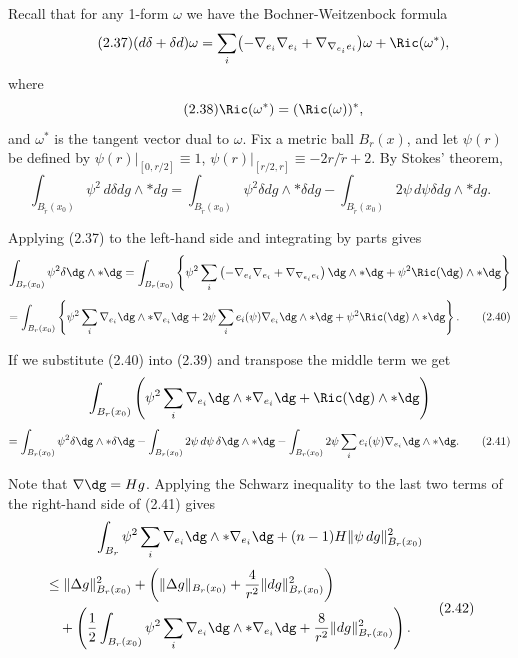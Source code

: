 Recall that for any 1-form $\omega$ we have the Bochner-Weitzenbock formula
\begin{equation}\tag{2.37}
(d\delta+\delta d)\omega=\sum_i\bigl(-\nabla_{e_i}\nabla_{e_i}+\nabla_{\nabla_{e_i}e_i}\bigr)\omega+\Ric(\omega^*),
\end{equation}
where
\begin{equation}\tag{2.38}
\Ric(\omega^*)=(\Ric(\omega))^*,
\end{equation}
and $\omega^*$ is the tangent vector dual to $\omega$. Fix a metric ball $B_r(x)$, and let $\psi(r)$ be defined by $\psi(r)|_{[0,r/2]}\equiv 1$, $\psi(r)|_{[r/2,r]}\equiv -2r/\tilde r+2$. By Stokes' theorem,
\begin{equation}\tag{2.39}
\int_{B_{\tilde r}(x_0)}\psi^2\, d\delta dg\wedge *dg
=\int_{B_{\tilde r}(x_0)}\psi^2\delta dg\wedge *\delta dg
-\int_{B_{\tilde r}(x_0)}2\psi\, d\psi\delta dg\wedge *dg.
\end{equation}

Applying (2.37) to the left-hand side and integrating by parts gives
\[
\int_{B_r(x_0)} \psi^2 \delta \dg \wedge *\dg
= \int_{B_r(x_0)} \left\{ \psi^2 \sum_i \left(-\nabla_{e_i}\nabla_{e_i} + \nabla_{\nabla_{e_i} e_i}\right)\dg \wedge *\dg + \psi^2 \Ric(\dg) \wedge *\dg \right\}
\]
\begin{equation}
= \int_{B_r(x_0)} \left\{ \psi^2 \sum_i \nabla_{e_i}\dg \wedge *\nabla_{e_i}\dg + 2\psi \sum_i e_i(\psi)\nabla_{e_i}\dg \wedge *\dg
+ \psi^2 \Ric(\dg) \wedge *\dg \right\}.
\tag{2.40}
\end{equation}

If we substitute (2.40) into (2.39) and transpose the middle term we get
\[
\int_{B_r(x_0)} \left( \psi^2 \sum_i \nabla_{e_i}\dg \wedge *\nabla_{e_i}\dg + \Ric(\dg)\wedge *\dg \right)
\]
\begin{equation}
= \int_{B_r(x_0)} \psi^2 \delta \dg \wedge *\delta \dg
- \int_{B_r(x_0)} 2\psi\, d\psi\,\delta \dg \wedge *\dg
- \int_{B_r(x_0)} 2\psi \sum_i e_i(\psi)\nabla_{e_i}\dg \wedge *\dg.
\tag{2.41}
\end{equation}

Note that $\nabla \dg = Hg$. Applying the Schwarz inequality to the last two terms of the right-hand side of (2.41) gives
\[
\int_{B_r} \psi^2 \sum_i \nabla_{e_i}\dg \wedge *\nabla_{e_i}\dg + (n-1)H \|\psi\,dg\|^2_{B_r(x_0)}
\]
\begin{equation}
\begin{aligned}
&\le \|\Delta g\|^2_{B_r(x_0)}
+ \left(\|\Delta g\|_{B_r(x_0)} + \frac{4}{r^2}\|dg\|^2_{B_r(x_0)}\right) \\
&\quad + \left(\frac12\int_{B_r(x_0)} \psi^2 \sum_i \nabla_{e_i}\dg \wedge *\nabla_{e_i}\dg
+ \frac{8}{r^2}\|dg\|^2_{B_r(x_0)}\right).
\end{aligned}
\tag{2.42}
\end{equation}

